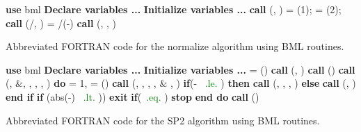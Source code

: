 \begin{algorithm}[H]
  \algrenewcommand{}
  \begin{algorithmic}
    \label{norm}
    \parskip 0.05cm
    {\fontsize{0.3cm}{0.3em}\selectfont 
      \State \textbf{use} bml
      \State \textbf{Declare variables ...}
      \State \textbf{Initialize variables ...}
       \State \textbf{call} (\hbml, \gb)      
      \State \eminb = \gb(1); \emaxb = \gb(2);
      \State \textbf{call} (\mone/\emaxb, \hbml) 
      \State \gf = \emaxb/(\emaxb-\eminb)
      \State \textbf{call} (\hbml, \gf, \thr) 
        \EndFunction
    }       
  \end{algorithmic}
  \caption{Abbreviated FORTRAN code for the normalize algorithm using BML routines.}
\end{algorithm}

\begin{algorithm}[H]
  \algrenewcommand{}
  \begin{algorithmic}
    \label{sp2}
    \parskip 0.05cm
    {\fontsize{0.3cm}{0.3em}\selectfont 
      \State \textbf{use} bml
      \State \textbf{Declare variables ...}
      \State \textbf{Initialize variables ...}
      \State \norb = (\hbml)
      \State \textbf{call} (\hbml, \pbml)                       
     \State \textbf{call} (\pbml)
      \State \textbf{call} (\type, \elem
      \State $\&$, \lprec, \norb, \norb, \xx)      
      \State \textbf{do} \iter = 1, \imax
      \State \qquad \trxb = (\pbml)
      \State  \qquad \textbf{call} (\pbml, \pbml, \xx, \mone,
      \State  \qquad  $\&$ \one, \thr)
      \State  \qquad \textbf{if}(\trxb - \noc \, \textcolor{green}{.le.} \zero) \textbf{then}
      \State  \qquad \qquad \textbf{call} (\one, \pbml, \one, \xx)
      \State  \qquad \textbf{else}
      \State  \qquad \qquad \textbf{call} (\xx, \pbml)             
      \State  \qquad \textbf{end if}
      \State  \qquad \textbf{if} (abs(\noc-\trxb) \, \textcolor{green}{.lt.} \tol)) \textbf{exit}
      \State  \qquad \textbf{if}(\iter \, \textcolor{green}{.eq.} \miter) \textbf{stop}
      \State \textbf{end do}
      \State \textbf{call} (\xx)
      \EndFunction
    }       
  \end{algorithmic}
  \caption{Abbreviated FORTRAN code for the SP2 algorithm using BML routines.}
\end{algorithm}

